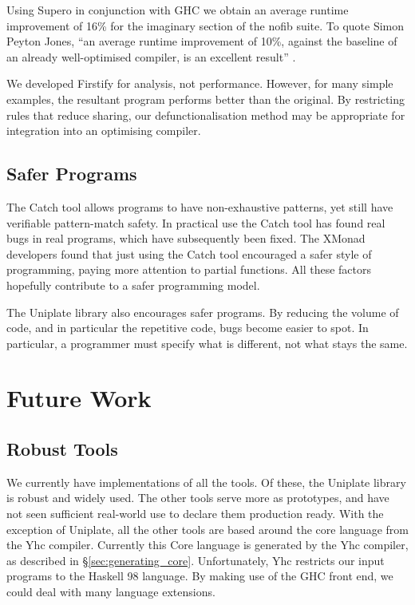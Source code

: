 Using Supero in conjunction with GHC we obtain an average runtime improvement of 16\% for the imaginary section of the nofib suite. To quote Simon Peyton Jones, ``an average runtime improvement of 10\%, against the baseline of an already well-optimised compiler, is an excellent result'' \cite{spj:specconstr}.

We developed Firstify for analysis, not performance. However, for many simple examples, the resultant program performs better than the original. By restricting rules that reduce sharing, our defunctionalisation method may be appropriate for integration into an optimising compiler.

\subsection{Safer Programs}

The Catch tool allows programs to have non-exhaustive patterns, yet still have verifiable pattern-match safety. In practical use the Catch tool has found real bugs in real programs, which have subsequently been fixed. The XMonad developers found that just using the Catch tool encouraged a safer style of programming, paying more attention to partial functions. All these factors hopefully contribute to a safer programming model.

The Uniplate library also encourages safer programs. By reducing the volume of code, and in particular the repetitive code, bugs become easier to spot. In particular, a programmer must specify what is different, not what stays the same.

\section{Future Work}
\label{sec:future_work}

\subsection{Robust Tools}

We currently have implementations of all the tools. Of these, the Uniplate library is robust and widely used. The other tools serve more as prototypes, and have not seen sufficient real-world use to declare them production ready. With the exception of Uniplate, all the other tools are based around the core language from the Yhc compiler. Currently this Core language is generated by the Yhc compiler, as described in \S\ref{sec:generating_core}. Unfortunately, Yhc restricts our input programs to the Haskell 98 language. By making use of the GHC front end, we could deal with many language extensions.

